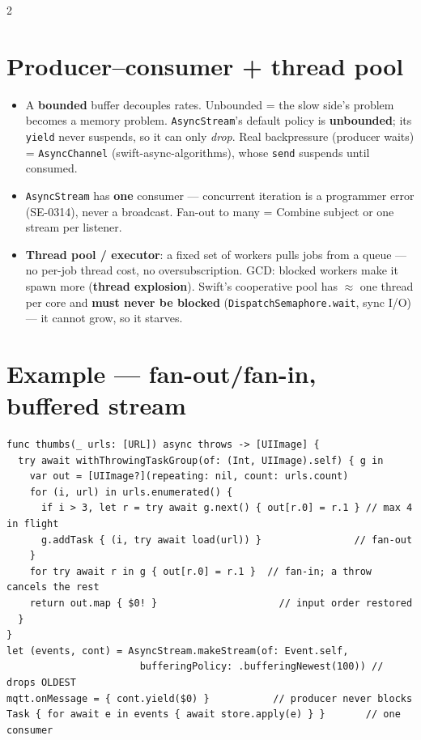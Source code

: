 \documentclass[8pt]{extarticle}
\newcommand\ct[1]{\texttt{#1}}
\begin{document}
\begin{multicols}{2}
\raggedright
\footnotesize{}

\section{Producer–consumer + thread pool}
\begin{itemize}
  \item A \textbf{bounded} buffer decouples rates. Unbounded = the slow side's
        problem becomes a memory problem. \ct{AsyncStream}'s default policy is
        \textbf{unbounded}; its \ct{yield} never suspends, so it can only
        \emph{drop}. Real backpressure (producer waits) = \ct{AsyncChannel}
        (swift-async-algorithms), whose \ct{send} suspends until consumed.
  \item \ct{AsyncStream} has \textbf{one} consumer — concurrent iteration is a
        programmer error (SE-0314), never a broadcast. Fan-out to many = Combine
        subject or one stream per listener.
  \item \textbf{Thread pool / executor}: a fixed set of workers pulls jobs from a
        queue — no per-job thread cost, no oversubscription. GCD: blocked workers
        make it spawn more (\textbf{thread explosion}). Swift's cooperative pool has
        $\approx$ one thread per core and \textbf{must never be blocked}
        (\ct{DispatchSemaphore.wait}, sync I/O) — it cannot grow, so it starves.
\end{itemize}

\section{Example — fan-out/fan-in, buffered stream}
\begin{lstlisting}[language=SwiftSheet]
func thumbs(_ urls: [URL]) async throws -> [UIImage] {
  try await withThrowingTaskGroup(of: (Int, UIImage).self) { g in
    var out = [UIImage?](repeating: nil, count: urls.count)
    for (i, url) in urls.enumerated() {
      if i > 3, let r = try await g.next() { out[r.0] = r.1 } // max 4 in flight
      g.addTask { (i, try await load(url)) }                // fan-out
    }
    for try await r in g { out[r.0] = r.1 }  // fan-in; a throw cancels the rest
    return out.map { $0! }                     // input order restored
  }
}
let (events, cont) = AsyncStream.makeStream(of: Event.self,
                       bufferingPolicy: .bufferingNewest(100)) // drops OLDEST
mqtt.onMessage = { cont.yield($0) }           // producer never blocks
Task { for await e in events { await store.apply(e) } }       // one consumer
\end{lstlisting}


\end{multicols}
\end{document}
